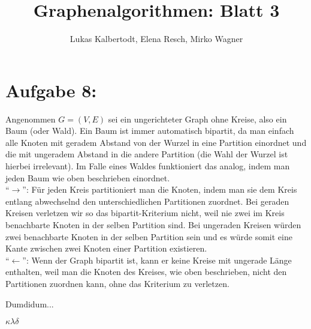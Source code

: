 \documentclass[11pt]{scrartcl} %
\title{Graphenalgorithmen: Blatt 3}
\author{Lukas Kalbertodt, Elena Resch, Mirko Wagner}
\begin{document}
\maketitle
\section*{Aufgabe 8:}
\begin{compactenum}[(a)]
\item Angenommen $G = (V, E)$ sei ein ungerichteter Graph ohne Kreise, also ein Baum (oder Wald). Ein Baum ist immer automatisch bipartit, da man einfach alle Knoten mit geradem Abstand von der Wurzel in eine Partition einordnet und die mit ungeradem Abstand in die andere Partition (die Wahl der Wurzel ist hierbei irrelevant). Im Falle eines Waldes funktioniert das analog, indem man jeden Baum wie oben beschrieben einordnet.\\
\enquote{$\rightarrow$}: Für jeden Kreis partitioniert man die Knoten, indem man sie dem Kreis entlang abwechselnd den unterschiedlichen Partitionen zuordnet. Bei geraden Kreisen verletzen wir so das bipartit-Kriterium nicht, weil nie zwei im Kreis benachbarte Knoten in der selben Partition sind. Bei ungeraden Kreisen würden zwei benachbarte Knoten in der selben Partition sein und es würde somit eine Kante zwischen zwei Knoten einer Partition existieren.\\
\enquote{$\leftarrow$}: Wenn der Graph bipartit ist, kann er keine Kreise mit ungerade Länge enthalten, weil man die Knoten des Kreises, wie oben beschrieben, nicht den Partitionen zuordnen kann, ohne das Kriterium zu verletzen.\\
\item Dumdidum...
\item $\kappa
\lambda
\delta$
\end{compactenum}
\end{document}
